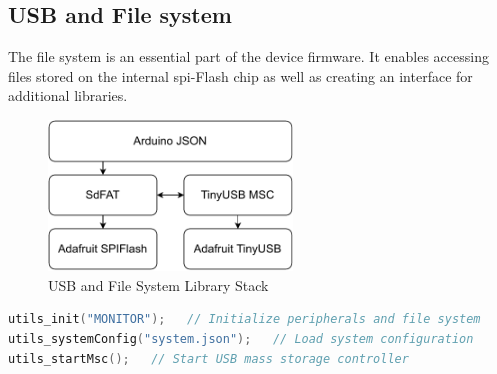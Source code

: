 \subsection{USB and File system}
The file system is an essential part of the device firmware. It enables accessing files stored on the internal \acrshort{spi}-Flash chip as well as creating an interface for additional libraries.

\medskip
\begin{figure}[h!]
	\centering
	\includegraphics[height=4cm]{images/file_system_stack.pdf}
	\caption{USB and File System Library Stack}
	\label{fig:file_system_stack}
\end{figure}

\begin{lstlisting}[backgroundcolor=\color{gray!10},  
                   basicstyle=\ttfamily,
                   columns=fullflexible,
                   breakatwhitespace=false,      
                   breaklines=true,                
                   captionpos=b,                    
                   commentstyle=\color{mygreen}, 
                   extendedchars=true,              
                   frame=single,                   
                   keepspaces=true,             
                   keywordstyle=\color{blue},      
                   language=c++,                 
                   numbers=none,                
                   numbersep=5pt,                   
                   numberstyle=\tiny\color{blue}, 
                   rulecolor=\color{mygray},        
                   showspaces=false,
                   showstringspaces=false,
                   showtabs=false,                 
                   stepnumber=5,                  
                   stringstyle=\color{mymauve},    
                   tabsize=3,                      
                   title=\lstname,
                   frame=none,
                   xleftmargin = 1cm,
                   framexleftmargin = 1em]
utils_init("MONITOR");   // Initialize peripherals and file system
utils_systemConfig("system.json");   // Load system configuration
utils_startMsc();   // Start USB mass storage controller
\end{lstlisting}



